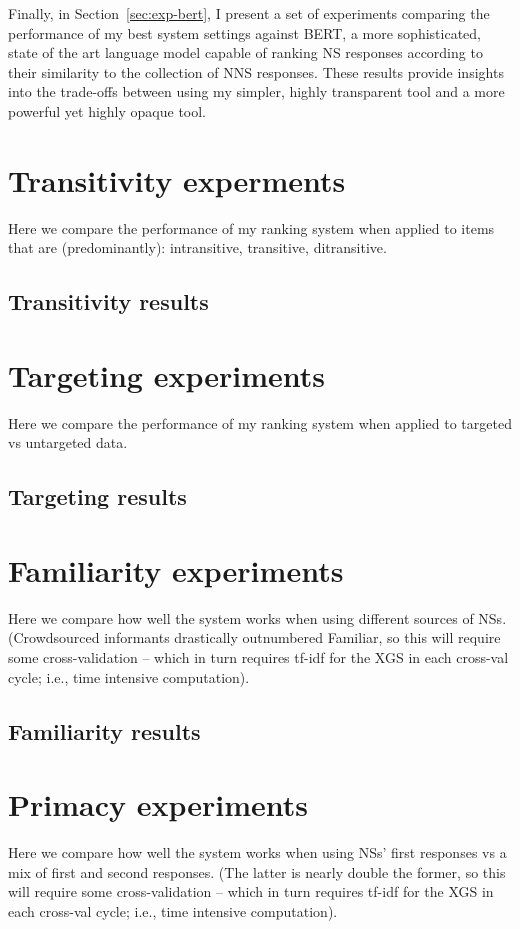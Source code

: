 Finally, in Section~\ref{sec:exp-bert}, I present a set of experiments comparing the performance of my best system settings against BERT, a more sophisticated, state of the art language model capable of ranking NS responses according to their similarity to the collection of NNS responses. These results provide insights into the trade-offs between using my simpler, highly transparent tool and a more powerful yet highly opaque tool.

\section{Transitivity experments}
\label{sec:exp-transitivity}
Here we compare the performance of my ranking system when applied to items that are (predominantly): intransitive, transitive, ditransitive.
\subsection{Transitivity results}
\label{sec:transitivity-results}

\section{Targeting experiments}
\label{sec:exp-targeting}
Here we compare the performance of my ranking system when applied to targeted vs untargeted data.
\subsection{Targeting results}
\label{sec:targeting-results}

\section{Familiarity experiments}
\label{sec:exp-familiarity}
Here we compare how well the system works when using different sources of NSs. (Crowdsourced informants drastically outnumbered Familiar, so this will require some cross-validation -- which in turn requires tf-idf for the XGS in each cross-val cycle; i.e., time intensive computation).
\subsection{Familiarity results}
\label{sec:familiarity-results}

\section{Primacy experiments}
\label{sec:exp-primacy}
Here we compare how well the system works when using NSs' first responses vs a mix of first and second responses. (The latter is nearly double the former, so this will require some cross-validation -- which in turn requires tf-idf for the XGS in each cross-val cycle; i.e., time intensive computation).
